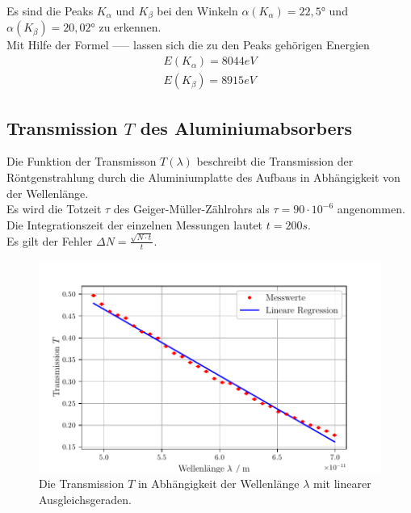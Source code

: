 Es sind die Peaks $K_{\alpha}$ und $K_{\beta}$ bei den Winkeln $\alpha(K_{\alpha})= 22,5°$ 
und $\alpha(K_{\beta}) = 20,02°$ zu erkennen.\\

Mit Hilfe der Formel ----- lassen sich die zu den Peaks gehörigen Energien
\begin{align*}
  E(K_{\alpha}) = 8044 eV \\
  E(K_{\beta}) = 8915 eV
\end{align*}





\subsection{Transmission $T$ des Aluminiumabsorbers}
\label{subsec:transmission}

Die Funktion der Transmisson $T(\lambda)$ beschreibt die Transmission der 
Röntgenstrahlung durch die Aluminiumplatte des Aufbaus in Abhängigkeit von der Wellenlänge.\\

Es wird die Totzeit $\tau$ des Geiger-Müller-Zählrohrs als $\tau = 90 \cdot 10^{-6}$ angenommen. Die 
Integrationszeit der einzelnen Messungen lautet $t = 200s$. \\
Es gilt der Fehler $\Delta N = \frac{\sqrt{N \cdot t}}{t}$.\\


\begin{figure}
  \centering
  \includegraphics{build/transmission.pdf}
  \caption{Die Transmission $T$ in Abhängigkeit der Wellenlänge $\lambda$ mit linearer Ausgleichsgeraden.}
  \label{fig:transm}
\end{figure}

